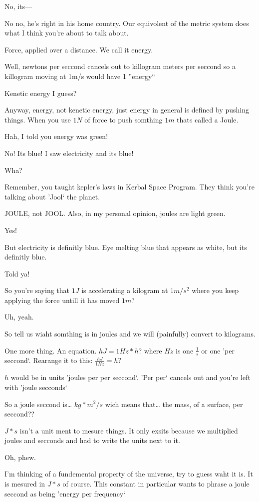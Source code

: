 \gr No, its---

\tek No no, he's right in his home country. Our equivolent of the metric system does what I think you're about to talk about.

\gr Force, applied over a distance. We call it energy.

\gr Well, newtons per seccond cancels out to killogram meters per seccond so a killogram moving at 1m/s would have 1 ''energy``

\tek Kenetic energy I guess?

\gr Anyway, energy, not kenetic energy, just energy in general is defined by pushing things. When you use $1N$ of force to push somthing $1m$ thats called a Joule.

\ker Hah, I told you energy was green!

\kev No! Its blue! I saw electricity and its blue!

\gr Wha?

\tek Remember, you taught kepler's laws in Kerbal Space Program. They think you're talking about 'Jool` the planet. 

\gr JOULE, not JOOL. Also, in my personal opinion, joules are light green.

\ker Yes!

\gr But electricity is definitly blue. Eye melting blue that appears as white, but its definitly blue.

\kev Told ya!

\tek So you're saying that $1J$ is accelerating a kilogram at $1m/s^2$ where you keep applying the force untill it has moved $1m$?

\gr Uh, yeah.

\tek So tell us wiaht somthing is in joules and we will (painfully) convert to kilograms.

\gr One more thing. An equation. $h J=1 Hz*h ?$ where $Hz$ is one $\frac{1}{s}$ or one 'per seccond`. Rearange it to this: $\frac{h J}{1 Hz} = h ?$

\gr $h$ would be in units 'joules per per seccond`. 'Per per` cancels out and you're left with 'joule secconds`

\tek So a joule seccond is\ldots{} $kg*m^2/s$ wich means that\ldots{} the mass, of a surface, per seccond??

\gr $J*s$ isn't a unit ment to mesure things. It only exsits because we multiplied joules and secconds and had to write the units next to it.

\tek Oh, phew.

\gr I'm thinking of a fundemental property of the universe, try to guess waht it is. It is mesured in $J*s$ of course. This constant in particular wants to phrase a joule seccond as being 'energy per frequency`


